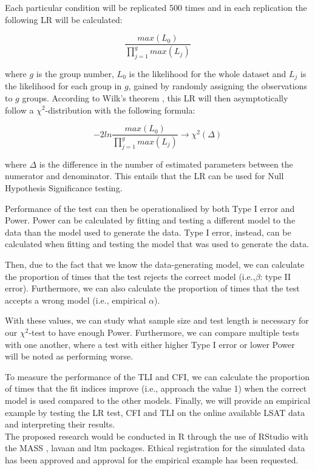 \documentclass{article}
\begin{document}
Each particular condition will be replicated 500 times and in each replication the following LR will be calculated:

\begin{equation}
\frac{max(L_0)}{\prod_{j = 1}^g max(L_j)}
\end{equation}

where $g$ is the group number, $L_0$ is the likelihood for the whole dataset and $L_j$ is the likelihood for each group in $g$, gained by randomly assigning the observations to $g$ groups. According to Wilk's theorem \autocite{wilkth}, this LR will then asymptotically follow a $\chi^2$-distribution with the following formula:

\begin{equation}
- 2ln\frac{max(L_0)}{\prod_{j = 1}^g max(L_j)} \rightarrow \chi^{2}(\Delta)
\end{equation}

where $\Delta$ is the difference in the number of estimated parameters between the numerator and denominator. This entails that the LR can be used for Null Hypothesis Significance testing. 

Performance of the test can then be operationalised by both Type I error and Power. Power can be calculated by fitting and testing a different model to the data than the model used to generate the data. Type I error, instead, can be calculated when fitting and testing the model that was used to generate the data.

Then, due to the fact that we know the data-generating model, we can calculate the proportion of times that the test rejects the correct model (i.e.,$\beta$: type II error). Furthermore, we can also calculate the proportion of times that the test accepts a wrong model (i.e., empirical $\alpha$). 

With these values, we can study what sample size and test length is necessary for our $\chi^2$-test to have enough Power. Furthermore, we can compare multiple tests with one another, where a test with either higher Type I error or lower Power will be noted as performing worse.

To measure the performance of the TLI and CFI, we can calculate the proportion of times that the fit indices improve (i.e., approach the value 1) when the correct model is used compared to the other models. Finally, we will provide an empirical example by testing the LR test, CFI and TLI on the online available LSAT data and interpreting their results. \\
\indent The proposed research would be conducted in R \autocite{R} through the use of RStudio \autocite{Rstudio} with the MASS \autocite{mass}, lavaan \autocite{lavaan} and ltm \autocite{ltmpack} packages. Ethical registration for the simulated data has been approved and approval for the empirical example has been requested.


\nocite{*}

\newpage
\printbibliography
\end{document}
